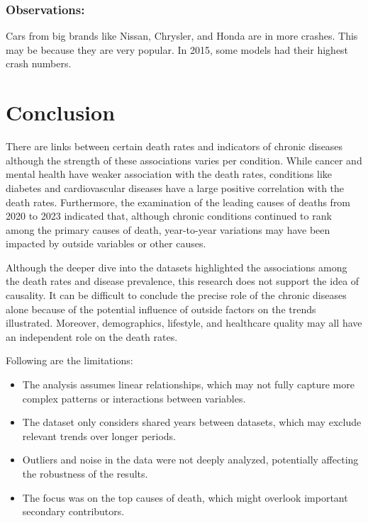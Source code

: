 \documentclass[a4paper,12pt]{article}
\begin{document}
\subsubsection{Observations:}
Cars from big brands like Nissan, Chrysler, and Honda are in more crashes. This may be because they are very popular. In 2015, some models had their highest crash numbers.



\section{Conclusion}

There are links between certain death rates and indicators of chronic diseases although the strength of these associations varies per condition. While cancer and mental health have weaker association with the death rates, conditions like diabetes and cardiovascular diseases have a large positive correlation with the death rates. Furthermore, the examination of the leading causes of deaths from 2020 to 2023 indicated that, although chronic conditions continued to rank among the primary causes of death, year-to-year variations may have been impacted by outside variables or other causes.

\vspace{1em}

Although the deeper dive into the datasets highlighted the associations among the death rates and disease prevalence, this research does not support the idea of causality. It can be difficult to conclude the precise role of the chronic diseases alone because of the potential influence of outside factors on the trends illustrated. Moreover, demographics, lifestyle, and healthcare quality may all have an independent role on the death rates.

\vspace{1em}

Following are the limitations:
\begin{itemize}
	\item The analysis assumes linear relationships, which may not fully capture more complex patterns or interactions between variables.
	\item The dataset only considers shared years between datasets, which may exclude relevant trends over longer periods.
	\item Outliers and noise in the data were not deeply analyzed, potentially affecting the robustness of the results.
	\item The focus was on the top causes of death, which might overlook important secondary contributors.
\end{itemize}
\end{document}
